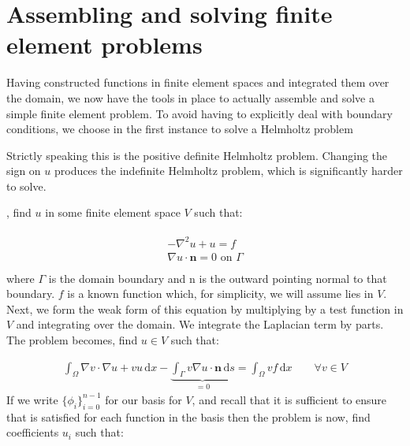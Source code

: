 \documentclass{book}
\begin{document}
\chapter{Assembling and solving finite element problems}
\label{\detokenize{6_finite_element_problems::doc}}\label{\detokenize{6_finite_element_problems:assembling-and-solving-finite-element-problems}}
Having constructed functions in finite element spaces and integrated
them over the domain, we now have the tools in place to actually
assemble and solve a simple finite element problem. To avoid having to
explicitly deal with boundary conditions, we choose in the first
instance to solve a Helmholtz problem %
\begin{footnote}[1]\sphinxAtStartFootnote
Strictly speaking this is the positive definite Helmholtz
problem. Changing the sign on \(u\) produces the
indefinite Helmholtz problem, which is significantly
harder to solve.
%
\end{footnote}, find \(u\) in some finite element
space \(V\) such that:

\label{\detokenize{6_finite_element_problems:equation-helmholtz}}\begin{align}\label{equation:6_finite_element_problems:helmholtz}\!\begin{aligned}
- \nabla^2 u + u = f\\
\nabla u \cdot \mathbf{n} = 0 \textrm{ on }\Gamma\\
\end{aligned}\end{align}
where \(\Gamma\) is the domain boundary and \(\mathrm{n}\) is the outward
pointing normal to that boundary. \(f\) is a known function which, for
simplicity, we will assume lies in \(V\). Next, we form the weak form of
this equation by multiplying by a test function in \(V\) and integrating
over the domain. We integrate the Laplacian term by parts. The problem
becomes, find \(u\in V\) such that:

\label{\detokenize{6_finite_element_problems:equation-weak_helmholtz}}\begin{equation}\label{equation:6_finite_element_problems:weak_helmholtz}
\begin{split}\int_\Omega \nabla v \cdot \nabla u + vu\, \mathrm{d} x
- \underbrace{\int_\Gamma v \nabla u \cdot \mathbf{n}\, \mathrm{d} s}_{=0} =
\int_\Omega v f\, \mathrm{d} x \qquad \forall v \in V\end{split}
\end{equation}
If we write \(\{\phi_i\}_{i=0}^{n-1}\) for our basis for \(V\), and recall that
it is sufficient to ensure that {\hyperref[\detokenize{6_finite_element_problems:equation-weak_helmholtz}]{}} is satisfied for
each function in the basis then the problem is now, find coefficients \(u_i\) such that:
\end{document}
